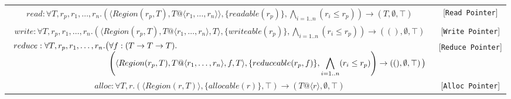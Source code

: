 \documentclass{article}
\newcommand{\rtriple}[3]{\left({#1},{#2},{#3}\right)}
\newcommand{\rsingle}[1]{\rtriple{#1}{\emptyset}{\top}}
\begin{document}
\begin{table*}
\centering
{\small
\begin{tabular}{cc}
%
% 
\begin{math}
\begin{array}{l}
read : \forall T,r_p,r_1,\ldots,r_n. \rtriple{\langle Region(r_p,T), T@\langle r_1, \ldots, r_n \rangle { } \rangle}{\{ readable(r_p) \}}{\displaystyle\bigwedge_{i = 1..n} (r_i \le r_p)} \rightarrow \rsingle{T}
\end{array}
\end{math} & [{\tt Read Pointer}] \\

%
%
\begin{math}
write : \forall T,r_p,r_1,\ldots,r_n. \rtriple{\langle Region(r_p,T), T@\langle r_1, \ldots, r_n \rangle, T \rangle}{\{ writeable(r_p) \}}{\displaystyle\bigwedge_{i = 1..n} (r_i \le r_p)} \rightarrow \rsingle{()}
\end{math} & [{\tt Write Pointer}] \\

%
%
\begin{math}
\begin{array}{l@{}l}
reduce : \forall T,r_p,r_1,\ldots,r_n. \big( & \forall f:(T \rightarrow T \rightarrow T). \\
& \rtriple{\langle Region(r_p,T), T@\langle r_1, \ldots, r_n \rangle, f, T \rangle}{\{ reduceable(r_p,f) \}}{\displaystyle\bigwedge_{i = 1..n} (r_i \le r_p)} \rightarrow \rsingle{()} \big) \end{array}
\end{math} & [{\tt Reduce Pointer}] \\

%
%
\begin{math}
alloc : \forall T,r. \rtriple{\langle Region(r,T) \rangle}{\{ allocable(r) \}}{\top} \rightarrow \rsingle{T@\langle r \rangle}
\end{math} & [{\tt Alloc Pointer}] \\


\end{tabular}}
\end{table*}
\end{document}
